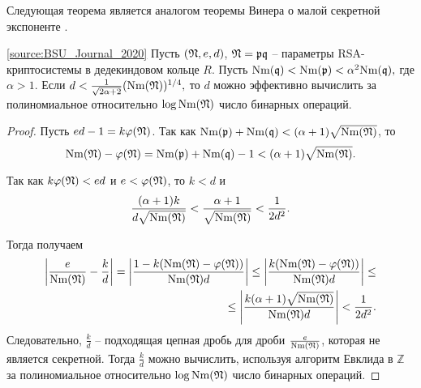 \documentclass[_00_dissertation.tex]{subfiles}
\begin{document}
Следующая теорема является аналогом теоремы Винера о малой секретной экспоненте \cite{source:Wiener}.

\begin{theorem}\label{theorem:Wiener}\ref{source:BSU_Journal_2020}
    Пусть $(\mathfrak{N},e,d)$, $\mathfrak{N}=\mathfrak{p} \mathfrak{q}$ -- параметры RSA-криптосистемы в дедекиндовом кольце $R$.
    Пусть $\textrm{Nm}(\mathfrak{q}) < \textrm{Nm}(\mathfrak{p}) < \alpha^2 \textrm{Nm}(\mathfrak{q}),$ где $\alpha > 1.$
    Если $d<\frac{1}{\sqrt{2\alpha+2}}(\textrm{Nm}(\mathfrak{N}))^{1/4},$ то $d$ можно эффективно вычислить за полиномиальное относительно $\log \textrm{Nm}(\mathfrak{N})$ число бинарных операций.
\end{theorem}
\begin{proof}
    Пусть $ed - 1 = k \varphi(\mathfrak{N})$.
    Так как $\textrm{Nm}(\mathfrak{p}) + \textrm{Nm}(\mathfrak{q}) < (\alpha + 1)\sqrt{\textrm{Nm}(\mathfrak{N})}$, то
    \begin{equation*}
        \textrm{Nm}(\mathfrak{N}) - \varphi(\mathfrak{N}) = \textrm{Nm}(\mathfrak{p}) + \textrm{Nm}(\mathfrak{q}) - 1 < (\alpha + 1)\sqrt{\textrm{Nm}(\mathfrak{N})}.
    \end{equation*}
    
    Так как $k \varphi(\mathfrak{N}) < ed$ и $e < \varphi(\mathfrak{N})$, то $k < d$ и
    \begin{equation*}
        \frac{(\alpha + 1)k}{d\sqrt{\textrm{Nm}(\mathfrak{N})}} < \frac{\alpha + 1}{\sqrt{\textrm{Nm}(\mathfrak{N})}} < \frac{1}{2 d^2}.
    \end{equation*}
    
    Тогда получаем
    \begin{equation*}
        \begin{split}
            \left|
                \frac{e}{\textrm{Nm}(\mathfrak{N})} - \frac{k}{d}
            \right| = \left|
                \frac{1 - k(\textrm{Nm}(\mathfrak{N}) - \varphi(\mathfrak{N}))}{\textrm{Nm}(\mathfrak{N})d}
            \right| \le \left|
                \frac{k(\textrm{Nm}(\mathfrak{N}) - \varphi(\mathfrak{N}))}{\textrm{Nm}(\mathfrak{N})d}
            \right| \le \\
            \le \left|
                \frac{k(\alpha + 1)\sqrt{\textrm{Nm}(\mathfrak{N})}}{\textrm{Nm}(\mathfrak{N})d}
            \right| < \frac{1}{2 d^2}.
        \end{split}
    \end{equation*}
    Следовательно, $\frac{k}{d}$ -- подходящая цепная дробь для дроби $\frac{e}{\textrm{Nm}(\mathfrak{N})}$, которая не является секретной.
    Тогда $\frac{k}{d}$ можно вычислить, используя алгоритм Евклида в $\mathbb{Z}$ за полиномиальное относительно $\log \textrm{Nm}(\mathfrak{N})$ число бинарных операций.
\end{proof}
\end{document}
